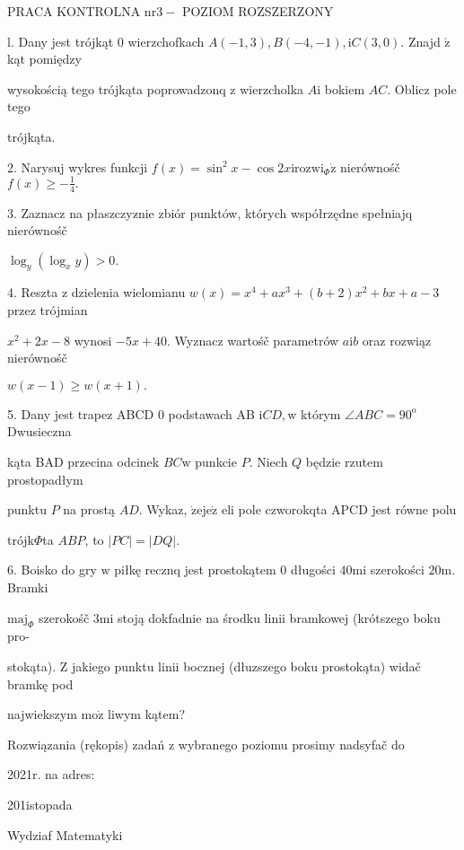 \documentclass[a4paper,12pt]{article}
\begin{document}
PRACA KONTROLNA $\mathrm{n}\mathrm{r} 3-$ POZIOM ROZSZERZONY

l. Dany jest trójkąt $0$ wierzchofkach $A(-1,3), B(-4,-1), \mathrm{i}C(3,0).$ Znajd $\acute{\mathrm{z}}$ kąt pomiędzy

wysokością tego trójkąta poprowadzonq $\mathrm{z}$ wierzcholka $A\mathrm{i}$ bokiem $AC$. Oblicz pole tego

trójkąta.

2. Narysuj wykres funkcji $f(x)=\sin^{2}x-\cos 2x\mathrm{i}\mathrm{r}\mathrm{o}\mathrm{z}\mathrm{w}\mathrm{i}_{\Phi}\dot{\mathrm{z}}$ nierównośč $f(x)\displaystyle \geq-\frac{1}{4}.$

3. Zaznacz na płaszczyz$\acute{}$nie zbiór punktów, których współrzędne spełniajq nierównośč

$\log_{y}(\log_{x}y)>0.$

4. Reszta $\mathrm{z}$ dzielenia wielomianu $w(x)=x^{4}+ax^{3}+(b+2)x^{2}+bx+a-3$ przez trójmian

$x^{2}+2x-8$ wynosi $-5x+40$. Wyznacz wartośč parametrów $a\mathrm{i}b$ oraz rozwiąz nierównośč

$w(x-1)\geq w(x+1).$

5. Dany jest trapez ABCD $0$ podstawach AB $\mathrm{i}CD, \mathrm{w}$ którym $\angle ABC=90^{\mathrm{o}}$ Dwusieczna

kąta BAD przecina odcinek $BC\mathrm{w}$ punkcie $P$. Niech $Q$ będzie rzutem prostopadłym

punktu $P$ na prostą $AD$. Wykaz, $\dot{\mathrm{z}}\mathrm{e}\mathrm{j}\mathrm{e}\dot{\mathrm{z}}$ eli pole czworokqta APCD jest równe polu

trójk$\Phi$ta $ABP$, to $|PC|=|DQ|.$

6. Boisko do gry $\mathrm{w}$ piłkę recznq jest prostokątem $0$ długości $40\mathrm{m}\mathrm{i}$ szerokości $20\mathrm{m}$. Bramki

$\mathrm{m}\mathrm{a}\mathrm{j}_{\Phi}$ szerokośč $3\mathrm{m}\mathrm{i}$ stoją dokfadnie na środku linii bramkowej (krótszego boku pro-

stokąta). $\mathrm{Z}$ jakiego punktu linii bocznej (dłuzszego boku prostokąta) widač bramkę pod

najwiekszym $\mathrm{m}\mathrm{o}\dot{\mathrm{z}}$ liwym kątem?

Rozwiązania (rękopis) zadań z wybranego poziomu prosimy nadsyfač do

2021r. na adres:

201istopada

Wydziaf Matematyki
\end{document}
